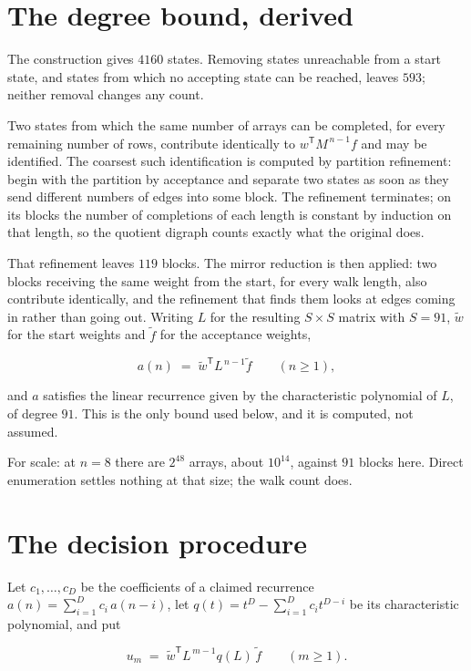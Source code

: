 \documentclass[11pt]{article}
\theoremstyle{definition}
\begin{document}
\section{The degree bound, derived}

The construction gives $4160$ states. Removing states unreachable from a start state, and states from which no accepting state can be reached, leaves $593$; neither removal changes any count.

Two states from which the same number of arrays can be completed, for every remaining number of rows, contribute identically to $w^{\mathsf T}M^{\,n-1}f$ and may be identified. The coarsest such identification is computed by partition refinement: begin with the partition by acceptance and separate two states as soon as they send different numbers of edges into some block. The refinement terminates; on its blocks the number of completions of each length is constant by induction on that length, so the quotient digraph counts exactly what the original does.

That refinement leaves $119$ blocks. The mirror reduction is then applied: two blocks receiving the same weight from the start, for every walk length, also contribute identically, and the refinement that finds them looks at edges coming in rather than going out. Writing $L$ for the resulting $S \times S$ matrix with $S = 91$, $\tilde w$ for the start weights and $\tilde f$ for the acceptance weights,

\[a(n) \;=\; \tilde w^{\mathsf T} L^{\,n-1} \tilde f \qquad (n \ge 1),\]

and $a$ satisfies the linear recurrence given by the characteristic polynomial of $L$, of degree $91$. This is the only bound used below, and it is computed, not assumed.

For scale: at $n = 8$ there are $2^{48}$ arrays, about $10^{14}$, against $91$ blocks here. Direct enumeration settles nothing at that size; the walk count does.

\section{The decision procedure}

Let $c_1,\dots,c_D$ be the coefficients of a claimed recurrence $a(n) = \sum_{i=1}^{D} c_i\,a(n-i)$, let $q(t) = t^{D} - \sum_{i=1}^{D} c_i t^{D-i}$ be its characteristic polynomial, and put

\[u_m \;=\; \tilde w^{\mathsf T} L^{\,m-1} q(L)\,\tilde f \qquad (m \ge 1).\]
\end{document}
